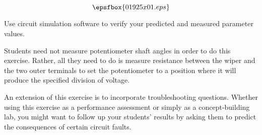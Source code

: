 

$$\epsfbox{01925x01.eps}$$

\vfil \eject






Use circuit simulation software to verify your predicted and measured parameter values.







Students need not measure potentiometer shaft angles in order to do this exercise.  Rather, all they need to do is measure resistance between the wiper and the two outer terminals to set the potentiometer to a position where it will produce the specified division of voltage.

An extension of this exercise is to incorporate troubleshooting questions.  Whether using this exercise as a performance assessment or simply as a concept-building lab, you might want to follow up your students' results by asking them to predict the consequences of certain circuit faults.




